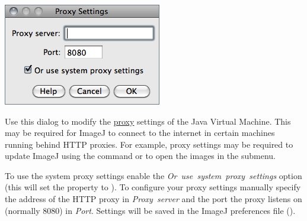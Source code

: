 

\subsubsection[\protect\userinterface{Proxy Settings\ldots{}}]{\protect{}\label{sub:Proxy-Settings...}}

\begin{minipage}[c][1\totalheight][t]{0.375\columnwidth}%
\includegraphics[scale=0.55]{images/ProxySettings}%
\end{minipage}%
\begin{minipage}[c][1\totalheight][t]{0.625\columnwidth}%
Use this dialog to modify the \href{http://en.wikipedia.org/wiki/Proxy_server}{proxy}
settings of the Java Virtual Machine. This may be required for ImageJ
to connect to the internet in certain machines running behind HTTP
proxies. For example, proxy settings may be required to update ImageJ
using the 
command or to open the images in the 
submenu. %
\end{minipage}

To use the system proxy settings enable the \emph{Or\ use\ system\ proxy\ settings}
option (this will set the  property
to ). To configure your proxy settings manually specify
the address of the HTTP proxy in \emph{Proxy\ server }and\emph{ }the
port the proxy listens on (normally 8080) in \emph{Port}. Settings
will be saved in the ImageJ preferences file ().


\subsubsection{\protect{}\label{sub:Compiler...}}

